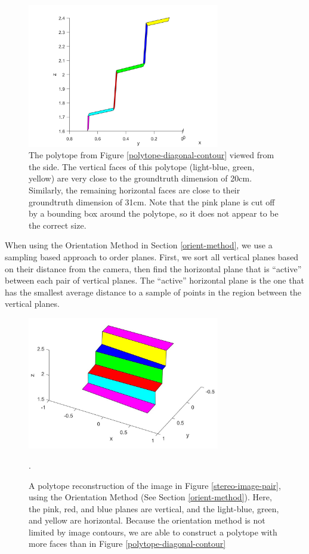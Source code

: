 \begin{figure}[!h]
\centering
\includegraphics[width=3.3in]{Sections/Figures/polytope_sideview.png}
\caption{The polytope from Figure \ref{polytope-diagonal-contour} viewed from the side. The vertical faces of this polytope (light-blue, green, yellow) are very close to the groundtruth dimension of 20cm. Similarly, the remaining horizontal faces are close to their groundtruth dimension of 31cm. Note that the pink plane is cut off by a bounding box around the polytope, so it does not appear to be the correct size.}
\label{polytope-sideview-contour}
\end{figure}

When using the Orientation Method in Section \ref{orient-method}, we use a sampling based approach to order planes. First, we sort all vertical planes based on their distance from the camera, then find the horizontal plane that is ``active'' between each pair of vertical planes. The ``active'' horizontal plane is the one that has the smallest average distance to a sample of points in the region between the vertical planes.


\begin{figure}[!h]
\centering
\includegraphics[width=3.3in]{Sections/Figures/polytope_diagonal_geom.jpg}
\caption{A polytope reconstruction of the image in Figure \ref{stereo-image-pair}, using the Orientation Method (See Section \ref{orient-method}). Here, the pink, red, and blue planes are vertical, and the light-blue, green, and yellow are horizontal. Because the orientation method is not limited by image contours, we are able to construct a polytope with more faces than in Figure \ref{polytope-diagonal-contour}}.
\label{polytope-diagonal-orient}
\end{figure}

